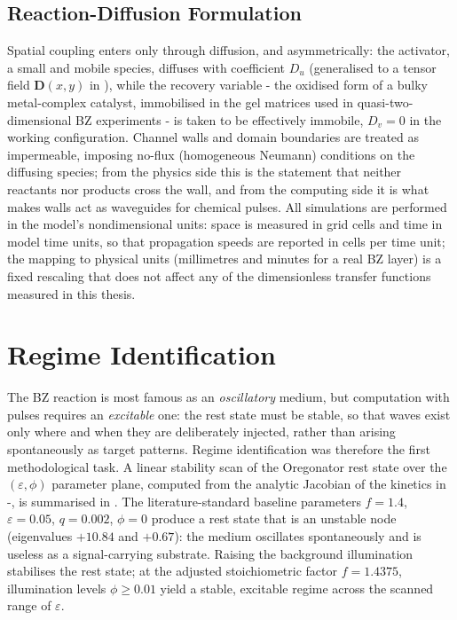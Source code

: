 \subsection{Reaction-Diffusion Formulation}
\label{sec:meth_rd}

Spatial coupling enters only through diffusion, and asymmetrically: the activator, a small and mobile species, diffuses with coefficient $D_{u}$ (generalised to a tensor field $\mathbf{D}(x,y)$ in ), while the recovery variable - the oxidised form of a bulky metal-complex catalyst, immobilised in the gel matrices used in quasi-two-dimensional BZ experiments - is taken to be effectively immobile, $D_{v} = 0$ in the working configuration. Channel walls and domain boundaries are treated as impermeable, imposing no-flux (homogeneous Neumann) conditions on the diffusing species; 
from the physics side this is the statement that neither reactants nor products cross the wall, and from the computing side it is what makes walls act as waveguides for chemical pulses. 
All simulations are performed in the model's nondimensional units: space is measured in grid cells and time in model time units, so that propagation speeds are reported in cells per time unit; the mapping to physical units (millimetres and minutes for a real BZ layer) is a fixed rescaling that does not affect any of the dimensionless transfer functions measured in this thesis.

\section{Regime Identification}
\label{sec:meth_regime}

The BZ reaction is most famous as an \emph{oscillatory} medium, but computation with pulses requires an \emph{excitable} one: the rest state must be stable, so that waves exist only where and when they are deliberately injected, rather than arising spontaneously as target patterns. 
Regime identification was therefore the first methodological task. 
A linear stability scan of the Oregonator rest state over the $(\varepsilon, \phi)$ parameter plane, computed from the analytic Jacobian of the kinetics in -, is summarised in . 
The literature-standard baseline parameters $f = 1.4$, $\varepsilon = 0.05$, $q = 0.002$, $\phi = 0$ produce a rest state that is an unstable node (eigenvalues $+10.84$ and $+0.67$): the medium oscillates spontaneously and is useless as a signal-carrying substrate. 
Raising the background illumination stabilises the rest state; at the adjusted stoichiometric factor $f = 1.4375$, illumination levels $\phi \geq 0.01$ yield a stable, excitable regime across the scanned range of $\varepsilon$.


